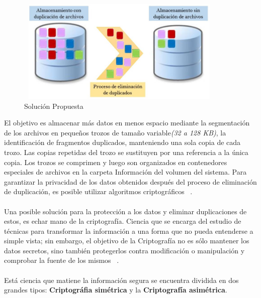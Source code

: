 \begin{figure}[H]
\centering
	\includegraphics[width=10cm, height=5cm]{./images/Deduplicacion.jpg}
	\caption{Solución Propuesta}
	\label{fig:1-3-1}
\end{figure}

El objetivo es almacenar más datos en menos espacio mediante la segmentación de los archivos en pequeños trozos de tamaño variable\textit{(32 a 128 KB)}, la identificación de fragmentos duplicados, manteniendo una sola copia de cada trozo. Las copias repetidas del trozo se sustituyen por una referencia a la única copia. Los trozos se comprimen y luego son organizados en contenedores especiales de archivos en la carpeta Información del volumen del sistema. Para garantizar la privacidad de los datos obtenidos después del proceso de eliminación de duplicación, es posible utilizar algoritmos criptográficos ~\cite{microsoft}.
\\ \\ 
Una posible solución para la protección a los datos y eliminar duplicaciones de estos, es echar mano de la criptografía. Ciencia que se encarga del estudio de técnicas para transformar la información a una forma que no pueda entenderse a simple vista; sin embargo, el objetivo de la Criptografía no es sólo mantener los datos secretos, sino también protegerlos contra modificación o manipulación y comprobar la fuente de los mismos ~\cite{fundamentos}. 
\\  \\
Está ciencia que matiene la información segura se encuentra dividida en dos grandes tipos: \textbf{Criptográfia simétrica} y la \textbf{Criptografía asimétrica}.  

